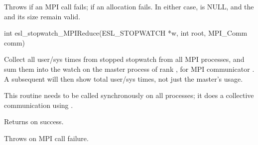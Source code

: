 \begin{sreapi}
Throws  if an MPI call fails;  if an allocation fails.
In either case,  is NULL, and the  and its size
 remain valid.


\hypertarget{func:esl_stopwatch_MPIReduce()}
{\item[int esl\_stopwatch\_MPIReduce(ESL\_STOPWATCH *w, int root, MPI\_Comm comm)]}

Collect all user/sys times from stopped stopwatch  from
all MPI processes, and sum them into the watch on the
master process of rank , for MPI communicator
.  A subsequent  will
then show total user/sys times, not just the master's
usage.

This routine needs to be called synchronously on all
processes; it does a collective communication using
.

Returns  on success.

Throws  on MPI call failure.


\end{sreapi}

